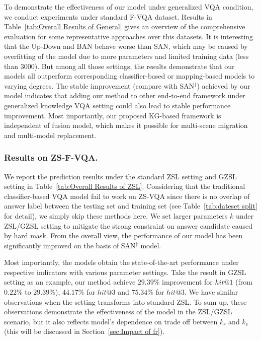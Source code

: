 \documentclass[runningheads]{llncs}
\newcommand{\cjy}[1]{{\color{black}#1}}
\begin{document}
To demonstrate the effectiveness of our model under generalized VQA condition, we conduct experiments under standard F-VQA dataset.
Results in Table~\ref{tab:Overall Results of General} gives an overview of the comprehensive evaluation for some representative approaches over this datasets. 
\cjy{It is} interesting that the Up-Down and BAN behave worse than SAN, which may be caused by overfitting of the model due to more parameters and limited training data (less than $3000$). 
But among all those settings, the results demonstrate that our models all outperform corresponding classifier-based or mapping-based models to varying degrees.
The stable improvement (compare with SAN$^\dag$) achieved by our model indicates that adding our method to other end-to-end framework under generalized knowledge VQA  setting could also lead to stable performance improvement. Most importantly, our proposed KG-based framework is independent of fusion model, which makes it possible for multi-scene migration and multi-model replacement.
\subsubsection{Results on ZS-F-VQA.}
We report the prediction results under the standard ZSL setting and GZSL setting in Table~\ref{tab:Overall Results of ZSL}. 
Considering that the traditional classifier-based VQA model fail to work on ZS-VQA since there is no overlap of answer label between the testing set and training set (see Table~\ref{tab:dateset split} for detail), we simply skip these methods here.
We set larger parameters $k$ under ZSL/GZSL setting to mitigate the strong constraint on answer candidate caused by hard mask.
From the overall view, the performance of our model has been significantly improved on the basis of SAN$^\dag$ model. 

Most importantly, the models obtain the state-of-the-art performance under respective indicators with various parameter settings. Take the result in GZSL setting as an example, our method achieve $29.39\%$ improvement  for $hit@1$ (from $0.22\%$ to $29.39\%$), $44.17\%$ for $hit@3$ and $75.34\%$ for $hit@3$.
We have similar observations when the setting transforms into standard ZSL.
To sum up. these observations demonstrate the effectiveness of the model in the ZSL/GZSL scenario, but it also reflects model's dependence on trade off between $k_r$ and $k_e$ (this will be discussed in Section~\ref{sec:Impact of fr}).
\end{document}
